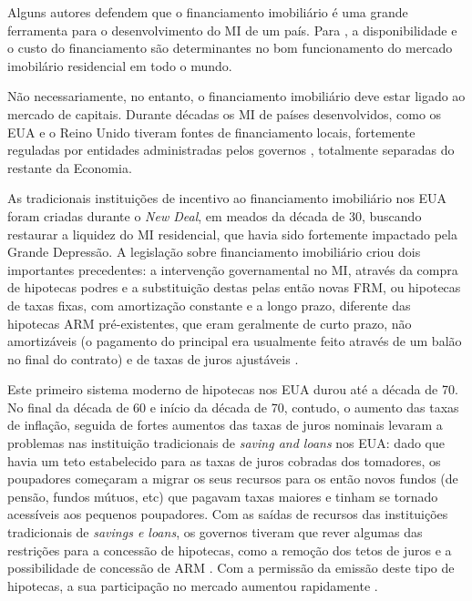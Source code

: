 \documentclass[
	12pt,				%
	oneside,			%
	a4paper,			%
	chapter=TITLE,		%
	section=TITLE,		%
	english,			%
	brazil				%
	]{abntex2}
\begin{document}
\begin{refsection}
Alguns autores defendem que o financiamento imobiliário é uma grande ferramenta
para o desenvolvimento do \gls{MI} de um país. Para \textcite[p.~21]{green}, a
disponibilidade e o custo do financiamento são determinantes no bom
funcionamento do mercado imobilário residencial em todo o mundo.

Não necessariamente, no entanto, o financiamento imobiliário deve estar ligado
ao mercado de capitais. Durante décadas os \gls{MI} de países desenvolvidos,
como os EUA e o Reino Unido tiveram fontes de financiamento locais, fortemente
reguladas por entidades administradas pelos governos \autocite[p.~23]{green}, totalmente
separadas do restante da Economia.

As tradicionais instituições de incentivo ao financiamento imobiliário nos EUA
foram criadas durante o \emph{New Deal}, em meados da década de 30, buscando
restaurar a liquidez do \gls{MI} residencial, que havia sido fortemente
impactado pela Grande Depressão. A legislação sobre financiamento imobiliário
criou dois importantes precedentes: a intervenção governamental no \gls{MI},
através da compra de hipotecas podres e a substituição destas pelas então novas
\gls{FRM}, ou hipotecas de taxas fixas, com amortização constante e a longo
prazo, diferente das hipotecas \gls{ARM} pré-existentes, que eram geralmente de
curto prazo, não amortizáveis (o pagamento do principal era usualmente feito
através de um balão no final do contrato) e de taxas de juros ajustáveis
\autocite[p.~41-42]{green}.

Este primeiro sistema moderno de hipotecas nos EUA durou até a década de 70. No
final da década de 60 e início da década de 70, contudo, o aumento das taxas de
inflação, seguida de fortes aumentos das taxas de juros nominais levaram a
problemas nas instituição tradicionais de \emph{saving and loans} nos EUA: dado que
havia um teto estabelecido para as taxas de juros cobradas dos tomadores, os
poupadores começaram a migrar os seus recursos para os então novos fundos (de
pensão, fundos mútuos, etc) que pagavam taxas maiores e tinham se tornado
acessíveis aos pequenos poupadores. Com as saídas de recursos das instituições
tradicionais de \emph{savings e loans}, os governos tiveram que rever algumas das
restrições para a concessão de hipotecas, como a remoção dos tetos de juros e a
possibilidade de concessão de \gls{ARM} \autocite[p.39]{green}. Com a permissão da
emissão deste tipo de hipotecas, a sua participação no mercado aumentou
rapidamente \autocite[p.47]{green}.


\end{refsection}
\end{document}
